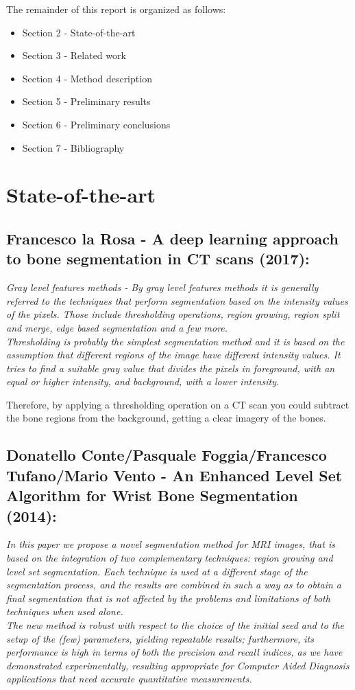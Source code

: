 \documentclass[conference]{IEEEtran}
\begin{document}
The remainder of this report is organized as follows:
\begin{itemize}
\item Section 2 - State-of-the-art
\item Section 3 - Related work
\item Section 4 - Method description
\item Section 5 - Preliminary results
\item Section 6 - Preliminary conclusions
\item Section 7 - Bibliography
\end{itemize}

\section{State-of-the-art}

\subsection{ \textbf{Francesco la Rosa - A deep learning approach to bone segmentation in CT scans (2017)}:}
\textit{Gray level features methods - By gray level features methods it is generally referred to the techniques that perform segmentation based on the intensity values of the pixels. Those include thresholding operations, region growing, region split and merge, edge based segmentation and a few more.\\ Thresholding is probably the simplest segmentation method and it is based on the assumption that different regions of the image have different intensity values. It tries to find a suitable gray value that divides the pixels in foreground, with an equal or higher intensity,
and background, with a lower intensity.}

Therefore, by applying a thresholding operation on a CT scan you could subtract the bone regions from the background, getting a clear imagery of the bones.

\subsection{ \textbf{Donatello Conte/Pasquale Foggia/Francesco Tufano/Mario Vento - An Enhanced Level Set Algorithm for Wrist Bone Segmentation (2014)}:}
\textit{In this paper we propose a novel segmentation method for MRI images, that is based on the
integration of two complementary techniques: region growing and level set segmentation.
Each technique is used at a different stage of the segmentation process, and the results are
combined in such a way as to obtain a final segmentation that is not affected by the problems
and limitations of both techniques when used alone.
\\The new method is robust with respect to the choice of the initial seed and to the setup of the
(few) parameters, yielding repeatable results; furthermore, its performance is high in terms
of both the precision and recall indices, as we have demonstrated experimentally, resulting
appropriate for Computer Aided Diagnosis applications that need accurate quantitative
measurements.}
\end{document}
